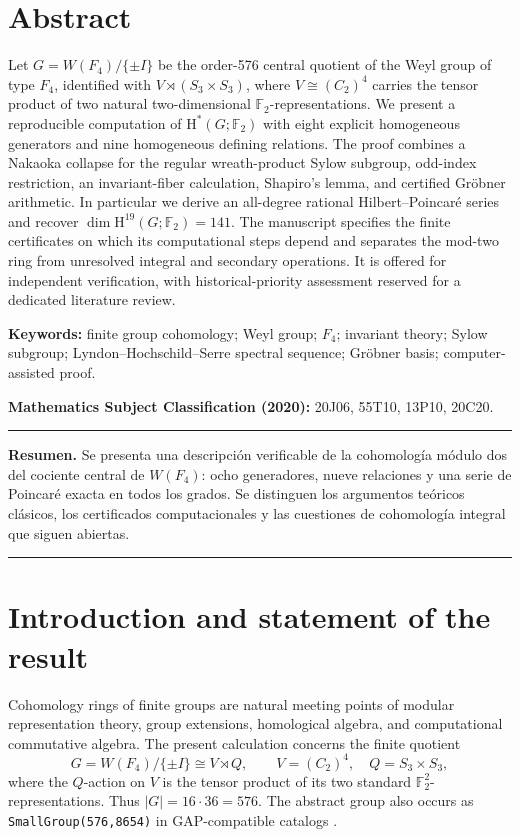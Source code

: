 \documentclass[11pt,a4paper]{article}
\theoremstyle{remark}\newtheorem{remark}[theorem]{Remark}
\newcommand{\F}{\mathbb F}
\newcommand{\HH}{\mathrm H}
\begin{document}
\section*{Abstract}
Let \(G=W(F_4)/\{\pm I\}\) be the order-576 central quotient of the Weyl group of type \(F_4\), identified with \(V\rtimes(S_3\times S_3)\), where \(V\cong(C_2)^4\) carries the tensor product of two natural two-dimensional \(\F_2\)-representations. We present a reproducible computation of \(\HH^*(G;\F_2)\) with eight explicit homogeneous generators and nine homogeneous defining relations. The proof combines a Nakaoka collapse for the regular wreath-product Sylow subgroup, odd-index restriction, an invariant-fiber calculation, Shapiro's lemma, and certified Gr\"obner arithmetic. In particular we derive an all-degree rational Hilbert--Poincar\'e series and recover \(\dim\HH^{19}(G;\F_2)=141\). The manuscript specifies the finite certificates on which its computational steps depend and separates the mod-two ring from unresolved integral and secondary operations. It is offered for independent verification, with historical-priority assessment reserved for a dedicated literature review.

\textbf{Keywords:} finite group cohomology; Weyl group; \(F_4\); invariant theory; Sylow subgroup; Lyndon--Hochschild--Serre spectral sequence; Gr\"obner basis; computer-assisted proof.

\textbf{Mathematics Subject Classification (2020):} 20J06, 55T10, 13P10, 20C20.
\vspace{2mm}
\hrule
\vspace{3mm}
{\small\textbf{Resumen.} Se presenta una descripci\'on verificable de la cohomolog\'ia m\'odulo dos del cociente central de \(W(F_4)\): ocho generadores, nueve relaciones y una serie de Poincar\'e exacta en todos los grados. Se distinguen los argumentos te\'oricos cl\'asicos, los certificados computacionales y las cuestiones de cohomolog\'ia integral que siguen abiertas.}
\newpage
\tableofcontents
\vspace{3mm}\hrule\vspace{4mm}

\section{Introduction and statement of the result}
Cohomology rings of finite groups are natural meeting points of modular representation theory, group extensions, homological algebra, and computational commutative algebra. The present calculation concerns the finite quotient
\begin{equation}\label{eq:group}
G=W(F_4)/\{\pm I\}\cong V\rtimes Q,\qquad
V=(C_2)^4,\quad Q=S_3\times S_3,
\end{equation}
where the \(Q\)-action on \(V\) is the tensor product of its two standard \(\F_2^2\)-representations. Thus \(|G|=16\cdot36=576\). The abstract group also occurs as \texttt{SmallGroup(576,8654)} in GAP-compatible catalogs \cite{gapchar}.
\end{document}
